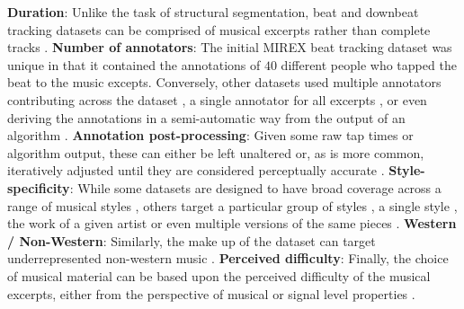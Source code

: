 \textbf{Duration}: Unlike the task of structural segmentation, beat and downbeat tracking datasets can be comprised of musical excerpts \cite{hainsworth04jasp,mckinney07jnmr,hockman12ismir, krebs13ismir} rather than complete tracks \cite{Goto2002,Mauch2009a,digiorgi2016jaes,eremenko18ismir}. \textbf{Number of annotators}: The initial MIREX beat tracking dataset \cite{mckinney07jnmr} was unique in that it contained the annotations of $40$ different people who tapped the beat to the music excepts. Conversely, other datasets used multiple annotators contributing across the dataset \cite{holzapfel12taslp}, a single annotator for all excerpts \cite{hainsworth04jasp}, or even deriving the annotations in a semi-automatic way from the output of an algorithm \cite{Mauch2009a}. \textbf{Annotation post-processing}: Given some raw tap times or algorithm output, these can either be left unaltered \cite{mckinney07jnmr} or, as is more common, iteratively adjusted until they are considered perceptually accurate \cite{holzapfel12taslp, hainsworth04jasp, hockman12ismir}. \textbf{Style-specificity}: While some datasets are designed to have broad coverage across a range of musical styles \cite{Goto2002,marchand15dafx,hainsworth04jasp}, others target a particular group of styles \cite{hockman12ismir,krebs13ismir}, a single style \cite{eremenko18ismir}, the work of a given artist \cite{Mauch2009a,digiorgi2016jaes} or even multiple versions of the same pieces \cite{sapp07ismir}. \textbf{Western / Non-Western}: Similarly, the make up of the dataset can target underrepresented non-western music \cite{srinivasamurthy14icassp, srinivasamurthy14jnmr,nunes15ismir}. \textbf{Perceived difficulty}: Finally, the choice of musical material can be based upon the perceived difficulty of the musical excerpts, either from the perspective of musical or signal level properties \cite{holzapfel12taslp}. 
